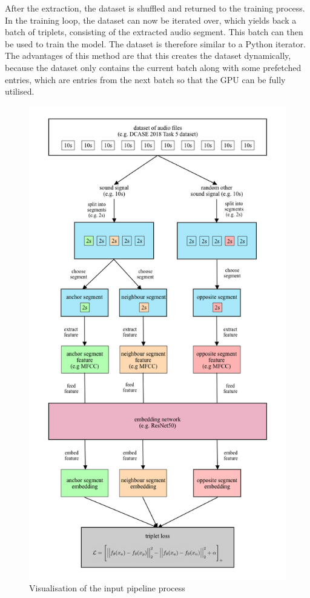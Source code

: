 \newline
\newline
After the extraction, the dataset is shuffled and returned to the training process. In the training loop, the dataset can now be iterated over, which yields back a batch of triplets, consisting of the extracted audio segment. This batch can then be used to train the model. The dataset is therefore similar to a Python iterator.
\newline
\newline
The advantages of this method are that this creates the dataset dynamically, because the dataset only contains the current batch along with some prefetched entries, which are entries from the next batch so that the \gls{GPU} can be fully utilised.
\begin{figure}[htbp]
	\centering
	\includegraphics[scale=0.4]{img/Input_Pipeline_Visualisation.png}
	\caption{Visualisation of the input pipeline process}
	\label{fig:Input-Pipeline-Visualisation}
\end{figure}

